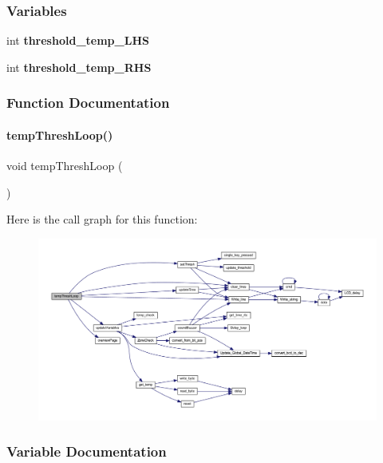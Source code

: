 \subsubsection*{Variables}
\begin{DoxyCompactItemize}
\item 
int \textbf{ threshold\+\_\+temp\+\_\+\+L\+HS}
\item 
int \textbf{ threshold\+\_\+temp\+\_\+\+R\+HS}
\end{DoxyCompactItemize}


\subsubsection{Function Documentation}
\mbox{\label{a00056_af9c48a1dcf99ec4adcf775f6c9a15566}} 
\paragraph{temp\+Thresh\+Loop()}
{\footnotesize\ttfamily void temp\+Thresh\+Loop (\begin{DoxyParamCaption}{ }\end{DoxyParamCaption})}

Here is the call graph for this function\+:
\nopagebreak
\begin{figure}[H]
\begin{center}
\leavevmode
\includegraphics[width=350pt]{a00056_af9c48a1dcf99ec4adcf775f6c9a15566_cgraph}
\end{center}
\end{figure}


\subsubsection{Variable Documentation}
\mbox{\label{a00056_aa3414c4147d0a1cf8f2c58d3a0c5a4d6}} 
